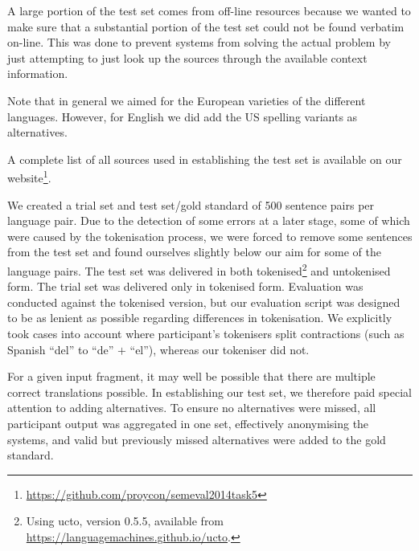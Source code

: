A large portion of the test set comes from off-line resources because we wanted
to make sure that a substantial portion of the test set could not be found
verbatim on-line. This was done to prevent systems from solving the actual
problem by just attempting to just look up the sources through the available
context information.

Note that in general we aimed for the European varieties of the different
languages. However, for English we did add the US spelling variants as
alternatives.

A complete list of all sources used in establishing the test set is available on our
website\footnote{\url{https://github.com/proycon/semeval2014task5}}.


We created a trial set and test set/gold standard of 500 sentence pairs per
language pair. Due to the detection of some errors at a later stage, some of
which were caused by the tokenisation process, we were forced to remove some
sentences from the test set and found ourselves slightly below our aim for some
of the language pairs. The test set was delivered in both
tokenised\footnote{Using ucto, version 0.5.5, available from \url{https://languagemachines.github.io/ucto}. }
and untokenised form. The trial set was delivered only in tokenised form.
Evaluation was conducted against the tokenised version, but our evaluation
script was designed to be as lenient as possible regarding differences in
tokenisation. We explicitly took cases into account where participant's
tokenisers split contractions (such as Spanish ``del'' to ``de'' $+$ ``el''),
whereas our tokeniser did not.

For a given input fragment, it may well be possible that there are multiple
correct translations possible. In establishing our test set, we therefore paid
special attention to adding alternatives. To ensure no alternatives were
missed, all participant output was aggregated in one set, effectively
anonymising the systems, and valid but previously missed alternatives were
added to the gold standard.


